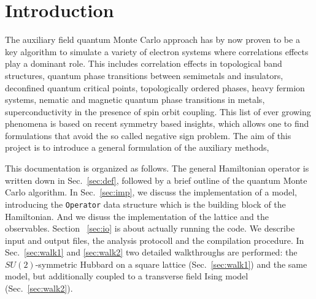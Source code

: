 \section{Introduction}\label{sec:intro}
The auxiliary field quantum Monte Carlo approach has by now proven to be a key algorithm to simulate a variety of  electron systems where correlations effects play a dominant role.  This includes correlation effects in topological band structures, quantum phase transitions between semimetals and insulators, deconfined quantum critical points, topologically ordered phases, heavy fermion systems, nematic and magnetic quantum phase transitions in metals,   superconductivity in the presence of spin orbit coupling. This list of ever growing phenomena is based on  recent  symmetry based insights, which allows one to  find formulations that avoid the so called negative sign problem.   The aim of this project is to introduce a general formulation of the auxiliary methods, 

This documentation is organized as follows. The general Hamiltonian operator is written down in Sec.~\ref{sec:def}, followed by 
a brief outline  of the quantum Monte Carlo algorithm. 
In Sec.~\ref{sec:imp}, we discuss the implementation of a model, introducing the \texttt{Operator} data structure which is the building block of the Hamiltonian. And we disuss the implementation of the lattice and the observables.
Section ~\ref{sec:io} is about actually running the code. We describe input and output files, the analysis protocoll and the compilation procedure. 
In Sec.~\ref{sec:walk1} and \ref{sec:walk2} two detailed walkthroughs are performed: the $SU(2)$-symmetric Hubbard  on a square lattice (Sec.~\ref{sec:walk1}) and the same model, but additionally coupled to a transverse field Ising model (Sec.~\ref{sec:walk2}).



